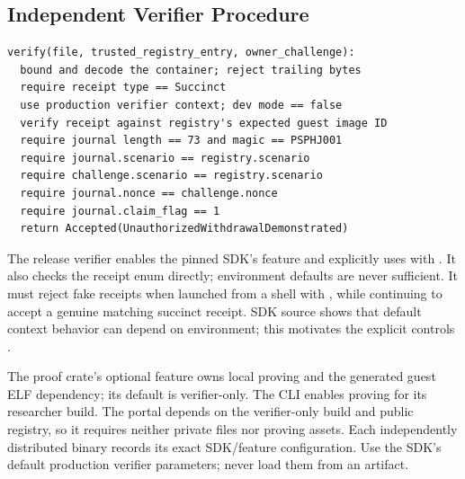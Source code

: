 \documentclass[11pt]{article}
\begin{document}
\subsection{Independent Verifier Procedure}
\begin{verbatim}
verify(file, trusted_registry_entry, owner_challenge):
  bound and decode the container; reject trailing bytes
  require receipt type == Succinct
  use production verifier context; dev mode == false
  verify receipt against registry's expected guest image ID
  require journal length == 73 and magic == PSPHJ001
  require journal.scenario == registry.scenario
  require challenge.scenario == registry.scenario
  require journal.nonce == challenge.nonce
  require journal.claim_flag == 1
  return Accepted(UnauthorizedWithdrawalDemonstrated)
\end{verbatim}

The release verifier enables the pinned SDK's  feature and explicitly uses  with . It also checks the receipt enum directly; environment defaults are never sufficient. It must reject fake receipts when launched from a shell with , while continuing to accept a genuine matching succinct receipt. SDK source shows that default context behavior can depend on environment; this motivates the explicit controls \cite{risc0receipt}.

The proof crate's optional  feature owns local proving and the generated guest ELF dependency; its default is verifier-only. The CLI enables proving for its researcher build. The portal depends on the verifier-only build and public registry, so it requires neither private files nor proving assets. Each independently distributed binary records its exact SDK/feature configuration. Use the SDK's default production verifier parameters; never load them from an artifact.
\end{document}
